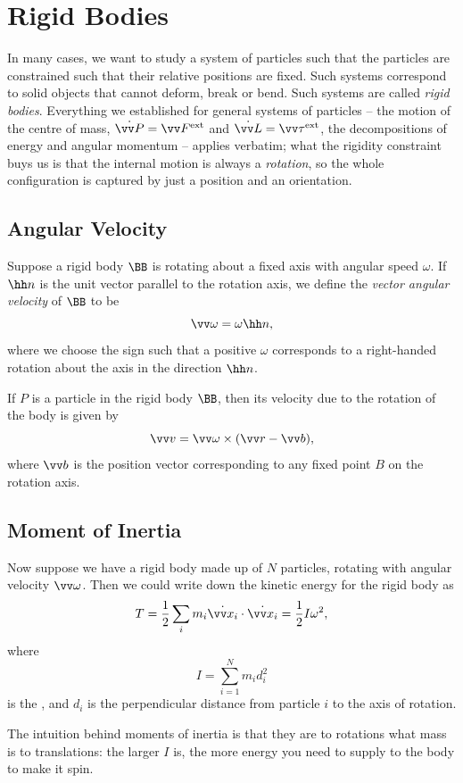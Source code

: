 \section{Rigid Bodies} \label{sec:rigid}

In many cases, we want to study a system of particles such that the particles are constrained such that their relative positions are fixed. Such systems correspond to solid objects that cannot deform, break or bend.
Such systems are called \emph{rigid bodies}. Everything we established for general systems of particles -- the motion of the centre of mass, $\dot{\vv P} = \vv F^{\text{ext}}$ and $\dot{\vv L} = \vv \tau^{\text{ext}}$, the decompositions of energy and angular momentum -- applies verbatim; what the rigidity constraint buys us is that the internal motion is always a \emph{rotation}, so the whole configuration is captured by just a position and an orientation.

\subsection{Angular Velocity}

Suppose a rigid body $\BB$ is rotating about a fixed axis with angular speed $\omega$. If $\hh n$ is the unit vector parallel to the rotation axis, we define the \emph{vector angular velocity} of $\BB$ to be
$$
\vv \omega = \omega \hh n,
$$
where we choose the sign such that a positive $\omega$ corresponds to a right-handed rotation about the axis in the direction $\hh n$.

If $P$ is a particle in the rigid body $\BB$, then its velocity due to the rotation of the body is given by
$$
\vv v = \vv \omega \times (\vv r - \vv b),
$$
where $\vv b$ is the position vector corresponding to any fixed point $B$ on the rotation axis.

\subsection{Moment of Inertia}

Now suppose we have a rigid body made up of $N$ particles, rotating with angular velocity $\vv \omega$. Then we could write down the kinetic energy for the rigid body as
$$
T = \frac{1}{2} \sum_{i} m_i  \dot{\vv x_i} \cdot \dot{\vv x_i} = \frac{1}{2}I \omega^2,
$$
where
$$
I = \sum_{i = 1}^N m_i d_i^2
$$
is the , and $d_i$ is the perpendicular distance from particle $i$ to the axis of rotation.

The intuition behind moments of inertia is that they are to rotations what mass is to translations: the larger $I$ is, the more energy you need to supply to the body to make it spin.

